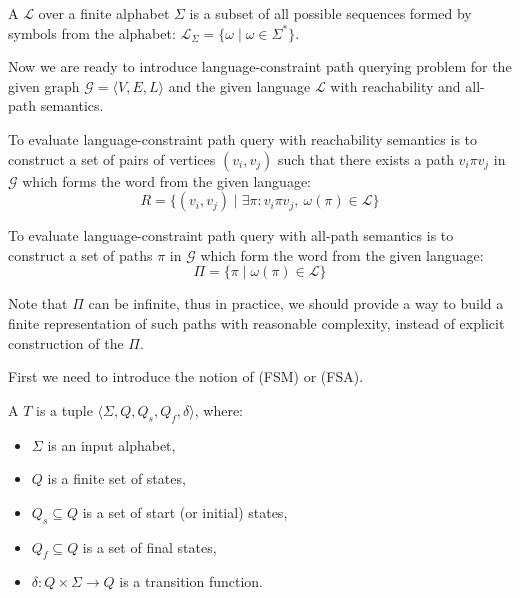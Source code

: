 \begin{definition}
A  $\mathcal{L}$ over a finite alphabet $\Sigma$ is a subset of all possible sequences formed by symbols from the alphabet: $\mathcal{L}_{\Sigma} = \{\omega \mid \omega \in \Sigma^*\}$.
\end{definition}

Now we are ready to introduce language-constraint path querying problem for the given graph  $\mathcal{G} = \langle V,E,L \rangle$ and the given language $\mathcal{L}$ with reachability and all-path semantics.

\begin{definition}
To evaluate language-constraint path query with reachability semantics is to construct a set of pairs of vertices $(v_i,v_j)$ such that there exists a path $v_i \pi v_j$ in $\mathcal{G}$ which forms the word from the given language:
$$
R = \{(v_i,v_j) \mid \exists \pi: v_i \pi v_j, \ \omega(\pi) \in \mathcal{L} \}
$$
\end{definition}

\begin{definition}
To evaluate language-constraint path query with all-path semantics is to construct a set of paths $\pi$ in $\mathcal{G}$ which form the word from the given language:
$$
\Pi = \{ \pi \mid \omega(\pi) \in \mathcal{L}\}
$$
\end{definition}

Note that $\Pi$ can be infinite, thus in practice, we should provide a way to build a finite representation of such paths with reasonable complexity, instead of explicit construction of the $\Pi$.



First we need to introduce the notion of  (FSM) or  (FSA).

\begin{definition}
A  $T$ is a tuple $\langle \Sigma, Q, Q_s, Q_f, \delta \rangle$, where:
\begin{itemize}
    \item $\Sigma$ is an input alphabet,
    \item $Q$ is a finite set of states,
    \item $Q_s \subseteq Q$ is a set of start (or initial) states,
    \item $Q_f \subseteq Q$ is a set of final states,
    \item $\delta: Q \times \Sigma \to Q$ is a transition function.
\end{itemize}
\end{definition}

